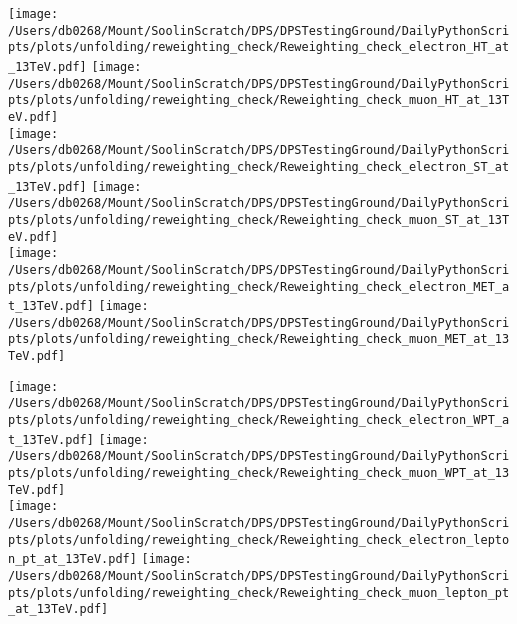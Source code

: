 \begin{figure*}[htpb]
	\centering
	\texttt{[image: /Users/db0268/Mount/SoolinScratch/DPS/DPSTestingGround/DailyPythonScripts/plots/unfolding/reweighting\_check/Reweighting\_check\_electron\_HT\_at\_13TeV.pdf]}
	\texttt{[image: /Users/db0268/Mount/SoolinScratch/DPS/DPSTestingGround/DailyPythonScripts/plots/unfolding/reweighting\_check/Reweighting\_check\_muon\_HT\_at\_13TeV.pdf]} \\
	\texttt{[image: /Users/db0268/Mount/SoolinScratch/DPS/DPSTestingGround/DailyPythonScripts/plots/unfolding/reweighting\_check/Reweighting\_check\_electron\_ST\_at\_13TeV.pdf]}
	\texttt{[image: /Users/db0268/Mount/SoolinScratch/DPS/DPSTestingGround/DailyPythonScripts/plots/unfolding/reweighting\_check/Reweighting\_check\_muon\_ST\_at\_13TeV.pdf]} \\
	\texttt{[image: /Users/db0268/Mount/SoolinScratch/DPS/DPSTestingGround/DailyPythonScripts/plots/unfolding/reweighting\_check/Reweighting\_check\_electron\_MET\_at\_13TeV.pdf]}
	\texttt{[image: /Users/db0268/Mount/SoolinScratch/DPS/DPSTestingGround/DailyPythonScripts/plots/unfolding/reweighting\_check/Reweighting\_check\_muon\_MET\_at\_13TeV.pdf]} \\
	\caption[]{}
	\label{fig:Bias1}
\end{figure*}

\begin{figure*}[htpb]
	\centering
	\texttt{[image: /Users/db0268/Mount/SoolinScratch/DPS/DPSTestingGround/DailyPythonScripts/plots/unfolding/reweighting\_check/Reweighting\_check\_electron\_WPT\_at\_13TeV.pdf]}
	\texttt{[image: /Users/db0268/Mount/SoolinScratch/DPS/DPSTestingGround/DailyPythonScripts/plots/unfolding/reweighting\_check/Reweighting\_check\_muon\_WPT\_at\_13TeV.pdf]} \\
	\texttt{[image: /Users/db0268/Mount/SoolinScratch/DPS/DPSTestingGround/DailyPythonScripts/plots/unfolding/reweighting\_check/Reweighting\_check\_electron\_lepton\_pt\_at\_13TeV.pdf]}
	\texttt{[image: /Users/db0268/Mount/SoolinScratch/DPS/DPSTestingGround/DailyPythonScripts/plots/unfolding/reweighting\_check/Reweighting\_check\_muon\_lepton\_pt\_at\_13TeV.pdf]} \\
	\caption[]{}
	\label{fig:Bias2}
\end{figure*}

